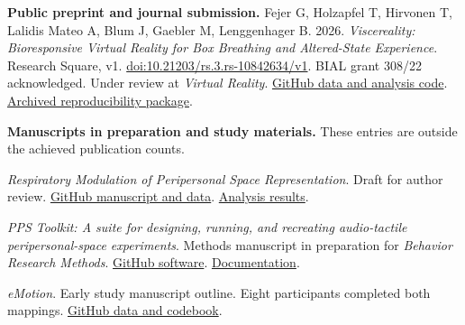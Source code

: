 \textbf{Public preprint and journal submission.} Fejer G, Holzapfel T, Hirvonen T, Lalidis Mateo A, Blum J, Gaebler M, Lenggenhager B. 2026. \emph{Viscereality: Bioresponsive Virtual Reality for Box Breathing and Altered-State Experience}. Research Square, v1. \href{https://doi.org/10.21203/rs.3.rs-10842634/v1}{doi:10.21203/rs.3.rs-10842634/v1}. BIAL grant 308/22 acknowledged. Under review at \emph{Virtual Reality}. \href{https://github.com/GeorgeFejer91/Viscereality-Bioresponsive-Virtual-Reality-for-Box-Breathing-and-Altered-State-Experience}{GitHub data and analysis code}. \href{https://doi.org/10.5281/zenodo.22073981}{Archived reproducibility package}.

\textbf{Manuscripts in preparation and study materials.} These entries are outside the achieved publication counts.

\emph{Respiratory Modulation of Peripersonal Space Representation}. Draft for author review. \href{https://github.com/GeorgeFejer91/Respiratory-Modulation-of-Peripersonal-Space-Representation}{GitHub manuscript and data}. \href{https://georgefejer91.github.io/Respiratory-Modulation-of-Peripersonal-Space-Representation/}{Analysis results}.

\emph{PPS Toolkit: A suite for designing, running, and recreating audio-tactile peripersonal-space experiments}. Methods manuscript in preparation for \emph{Behavior Research Methods}. \href{https://github.com/GeorgeFejer91/pps-kit}{GitHub software}. \href{https://ppskit.qzz.io/documentation/}{Documentation}.

\emph{eMotion}. Early study manuscript outline. Eight participants completed both mappings. \href{https://github.com/GeorgeFejer91/emotion-vr-data}{GitHub data and codebook}.
